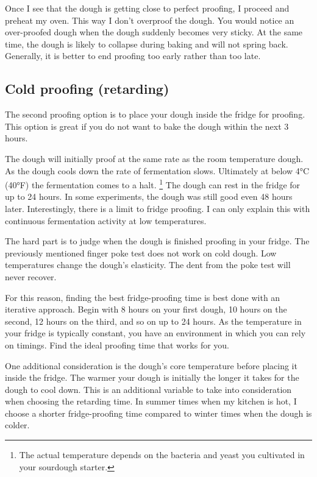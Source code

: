 Once I see that the dough is getting close to perfect proofing, I proceed and
preheat my oven. This way I don't overproof the dough. You would notice an
over-proofed dough when the dough suddenly becomes very sticky. At the same
time, the dough is likely to collapse during baking and will not spring back.
Generally, it is better to end proofing too early rather than too late.

\subsection{Cold proofing (retarding)}

The second proofing option is to place your dough inside the fridge for
proofing. This option is great if you do not want to bake the dough
within the next 3 hours.

The dough will initially proof at the same rate as the room temperature dough.
As the dough cools down the rate of fermentation slows. Ultimately at below
4°C (40°F) the fermentation comes to a halt. \footnote{The actual temperature
depends on the bacteria and yeast you cultivated in your sourdough
starter.} The dough can rest in the fridge for up to 24 hours. In some
experiments, the dough was still good even 48 hours later. Interestingly,
there is a limit to fridge proofing. I can only explain this with continuous
fermentation activity at low temperatures.

The hard part is to judge when the dough is finished proofing in your fridge.
The previously mentioned finger poke test does not work on cold dough. Low
temperatures change the dough's elasticity. The dent from the poke test
will never recover.

For this reason, finding the best fridge-proofing time is best done
with an iterative approach. Begin with 8 hours on your first dough,
10 hours on the second, 12 hours on the third, and so on up to 24 hours.
As the temperature in your fridge is typically constant, you have an
environment in which you can rely on timings. Find the ideal proofing
time that works for you.

One additional consideration is the dough's core temperature before
placing it inside the fridge. The warmer your dough is initially
the longer it takes for the dough to cool down. This is an additional
variable to take into consideration when choosing the retarding time.
In summer times when my kitchen is hot, I choose a shorter fridge-proofing
time compared to winter times when the dough is colder.

